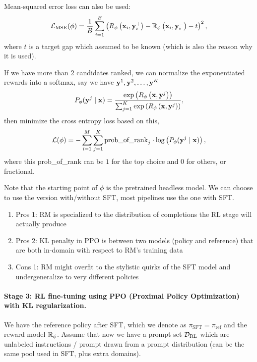 \documentclass[11pt]{article}  %
\begin{document}
Mean-squared error loss can also be used:
\begin{align*}
  \mathcal{L}_{\text{MSE}}(\phi) = \frac{1}{B}\sum_{i=1}^{B}\left( R_{\phi}\left( \mathbf{x}_i, \mathbf{y}_i^+ \right) - \mathbb{R}_\phi\left( \mathbf{x}_i, \mathbf{y}_i^- \right) - t \right)^2,
\end{align*}
where $t$ is a target gap which assumed to be known (which is also the reason why it is used).

If we have more than $2$ candidates ranked, we can normalize the exponentiated rewards into a softmax, say we have $\mathbf{y}^1, \mathbf{y}^2, \hdots, \mathbf{y}^K$ 
\begin{align*}
  P_{\phi}(\mathbf{y}^j \mid \mathbf{x}) = \frac{\exp\left( R_{\phi}\left( \mathbf{x}, \mathbf{y}^j \right) \right)}{\sum_{j=1}^{K}\exp\left( R_{\phi}\left( \mathbf{x}, \mathbf{y}^j \right) \right)},
\end{align*}
then minimize the cross entropy loss based on this,
\begin{align*}
  \mathcal{L} (\phi) = - \sum_{i=1}^M\sum_{j=1}^{K} \text{prob\_of\_rank}_j \cdot \log \left( P_{\phi}(\mathbf{y}^j \mid \mathbf{x}) \right), 
\end{align*}
where this prob\_of\_rank can be $1$ for the top choice and $0$ for others, or fractional.

Note that the starting point of $\phi$ is the pretrained headless model.
We can choose to use the version with/without SFT, most pipelines use the one with SFT.
\begin{enumerate}
  \item Pros 1: RM is specialized to the distribution of completions the RL stage will actually produce
  \item Pros 2: KL penalty in PPO is between two models (policy and reference) that are both in-domain with respect to RM's training data
  \item Cons 1: RM might overfit to the stylistic quirks of the SFT model and undergeneralize to very different policies
\end{enumerate}



\paragraph{Stage 3: RL fine-tuning using PPO (Proximal Policy Optimization) with KL regularization.} 
We have the reference policy after SFT, which we denote as $\pi_{\text{SFT}} = \pi_{\text{ref}}$ and the reward model $\mathbb{R}_{\phi}$.
Assume that now we have a prompt set $\mathcal{D}_{\text{RL}}$ which are unlabeled instructions / prompt drawn from a prompt distribution (can be the same pool used in SFT, plus extra domains).
\end{document}
